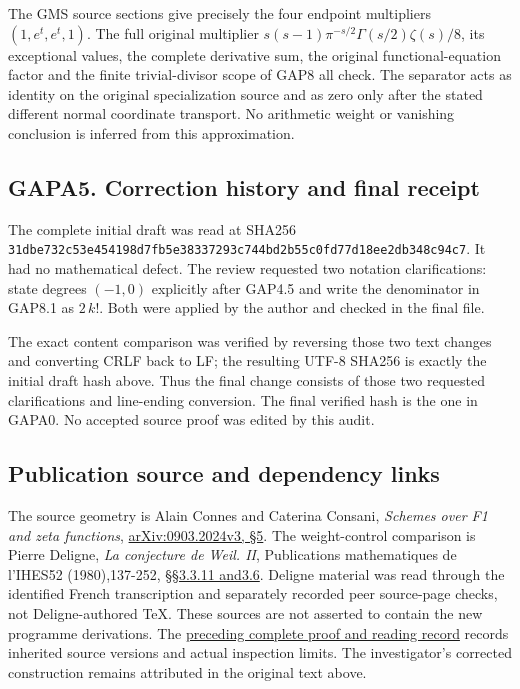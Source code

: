 The GMS source sections give precisely the four endpoint multipliers
\((1,e^t,e^t,1)\). The full original multiplier
\(s(s-1)\pi^{-s/2}\Gamma(s/2)\zeta(s)/8\), its exceptional values, the
complete derivative sum, the original functional-equation factor and the
finite trivial-divisor scope of GAP8 all check. The separator acts as
identity on the original specialization source and as zero only after
the stated different normal coordinate transport. No arithmetic weight
or vanishing conclusion is inferred from this approximation.

\subsection{GAPA5. Correction history and final
receipt}\label{gapa5.-correction-history-and-final-receipt}

The complete initial draft was read at SHA256
\texttt{31dbe732c53e454198d7fb5e38337293c744bd2b55c0fd77d18ee2db348c94c7}.
It had no mathematical defect. The review requested two notation
clarifications: state degrees \((-1,0)\) explicitly after GAP4.5 and
write the denominator in GAP8.1 as \(2\,k!\). Both were applied by the
author and checked in the final file.

The exact content comparison was verified by reversing those two text
changes and converting CRLF back to LF; the resulting UTF-8 SHA256 is
exactly the initial draft hash above. Thus the final change consists of
those two requested clarifications and line-ending conversion. The final
verified hash is the one in GAPA0. No accepted source proof was edited
by this audit.

\subsection{Publication source and dependency
links}\label{publication-source-and-dependency-links}

The source geometry is Alain Connes and Caterina Consani, \emph{Schemes
over F1 and zeta functions},
\href{https://arxiv.org/abs/0903.2024v3}{arXiv:0903.2024v3, §5}. The
weight-control comparison is Pierre Deligne, \emph{La conjecture de
Weil. II}, Publications mathematiques de l'IHES52 (1980),137-252,
\href{https://www.numdam.org/item/PMIHES_1980__52__137_0/}{§§3.3.11
and3.6}. Deligne material was read through the identified French
transcription and separately recorded peer source-page checks, not
Deligne-authored TeX. These sources are not asserted to contain the new
programme derivations. The
\href{https://github.com/KokunoYumeto/zeta-function-research-reader/blob/36a82ecca98addb8a98b48204e349737856c7223/workbenches/splitzero-tandem/continuations/20260924-cohomology-weight-and-character-lifts/BUILD_AND_REVIEW.md}{preceding
complete proof and reading record} records inherited source versions and
actual inspection limits. The investigator's corrected construction
remains attributed in the original text above.
